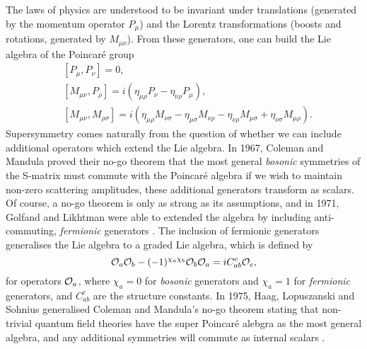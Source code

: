 The laws of physics are understood to be invariant under translations (generated by the momentum operator $P_\mu$) and the Lorentz transformations (boosts and rotations, generated by $M_{\mu \nu}$). From these generators, one can build the Lie algebra of the Poincar\'e group
\begin{equation}
\label{eq:poincaregroup}
\begin{aligned}
	&[P_\mu, P_\nu] = 0, \\
	&[M_{\mu \nu}, P_\rho] = i\left(\eta_{\mu \rho} P_\nu - \eta_{\nu \rho} P_\mu \right), \\
	&[M_{\mu \nu}, M_{\rho \sigma}] = i\left(\eta_{\mu \rho} M_{\nu \sigma} - \eta_{\mu \sigma} M_{\nu \rho} - \eta_{\nu \rho} M_{\mu \sigma} + \eta_{\nu \sigma} M_{\mu \rho} \right).
\end{aligned}
\end{equation}
Supersymmetry comes naturally from the question of whether we can include additional operators which extend the Lie algebra. In 1967, Coleman and Mandula \cite{Coleman:1967ad} proved their no-go theorem that the most general \emph{bosonic} symmetries of the S-matrix must commute with the Poincar\'e algebra if we wish to maintain non-zero scattering amplitudes, \ie these additional generators transform as scalars. Of course, a no-go theorem is only as strong as its assumptions, and in 1971, Golfand and Likhtman were able to extended the algebra by including anti-commuting, \emph{fermionic} generators \cite{Golfand:1971iw}. The inclusion of fermionic generators generalises the Lie algebra to a graded Lie algebra, which is defined by
\begin{equation*}
	{\cal O}_a {\cal O}_b - (-1)^{\chi_a \chi_b} {\cal O}_b {\cal O}_a = i C^{c}_{ab} {\cal O}_e,
\end{equation*}
for operators ${\cal O}_a$, where $\chi_a = 0$ for \emph{bosonic} generators and $\chi_a = 1$ for \emph{fermionic} generators, and $C^{c}_{ab}$ are the structure constants. In 1975, Haag, Lopuszanski and Sohnius generalised Coleman and Mandula's no-go theorem stating that non-trivial quantum field theories have the super Poincar\'e alebgra as the most general algebra, and any additional symmetries will commute as internal scalars \cite{Haag:1974qh}.

